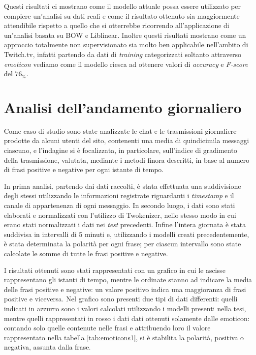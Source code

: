 \documentclass[a4paper,12pt,openright,twoside]{report}
\theoremstyle{definition}
\begin{document}
Questi risultati ci mostrano come il modello attuale possa essere utilizzato per compiere un'analisi su dati reali e 
come il risultato ottenuto sia maggiormente attendibile rispetto a quello che si 
otterrebbe ricorrendo all'applicazione di un'analisi basata su BOW e Liblinear.
Inoltre questi risultati mostrano come un approccio totalmente non supervisionato sia molto ben applicabile
nell'ambito di Twitch.tv, infatti partendo da dati di \emph{training} categorizzati soltanto attraverso \emph{emoticon}
vediamo come il modello riesca ad ottenere valori di \emph{accuracy} e \emph{F-score} del $76_\%$.

\section{Analisi dell'andamento giornaliero}
\label{sec:andamento}
Come caso di studio sono state analizzate le chat e le trasmissioni giornaliere prodotte da alcuni utenti
del sito, contenenti una media di quindicimila messaggi ciascuno,
e l’indagine si è focalizzata, in particolare, sull’indice di gradimento della trasmissione,  valutata, mediante i metodi finora descritti, in base al numero di frasi positive e negative per ogni istante di tempo.

In prima analisi, partendo dai dati raccolti, è stata effettuata una suddivisione degli stessi utilizzando
le informazioni registrate riguardanti i \emph{timestamp} e il canale di appartenenza di ogni messaggio.
In secondo luogo, i dati sono stati elaborati e normalizzati con l'utilizzo di Twokenizer, nello stesso modo
in cui erano stati normalizzati i dati nei \emph{test} precedenti.
Infine l'intera giornata è stata suddivisa in intervalli di 5 minuti e, utilizzando i modelli
creati precedentemente, è stata determinata la polarità per ogni frase; per ciascun intervallo sono state calcolate le 
somme di tutte le frasi positive e negative.

I risultati ottenuti sono stati rappresentati con un grafico in cui le ascisse rappresentano gli
istanti di tempo, mentre le ordinate stanno ad indicare la media delle frasi positive e negative:
un valore positivo indica
una maggioranza di frasi positive e viceversa.
Nel grafico sono presenti due tipi di dati differenti: quelli indicati in azzurro sono i valori calcolati
utilizzando i modelli presenti nella tesi, mentre quelli rappresentati in rosso  i dati dati ottenuti solamente
dalle emoticon: contando 
solo quelle contenute nelle frasi e attribuendo loro il valore rappresentato
nella tabella \ref{tab:emoticons1}, si è stabilita la polarità, positiva o negativa, assunta dalla frase.
\end{document}
